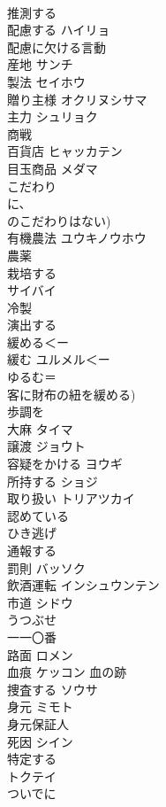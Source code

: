 \documentclass[8pt]{extreport}
\begin{document}
\begin{CJK}{UTF8}{min}
\\	推測する	
\\	配慮する	ハイリョ 
\\	配慮に欠ける言動 
\\	産地	サンチ 
\\	製法	セイホウ 
\\	贈り主様	オクリヌシサマ 
\\	主力	シュリョク 
\\	商戦	
\\	百貨店	ヒャッカテン 
\\	目玉商品	メダマ 
\\	こだわり	
\\	に、
\\	のこだわりはない)
\\	有機農法	ユウキノウホウ 
\\	農薬	
\\	栽培する	
\\	サイバイ
\\	冷製	
\\	演出する	
\\	緩める＜ー
\\	緩む	ユルメル＜ー
\\	ゆるむ＝
\\	客に財布の紐を緩める) 
\\	歩調を
\\	大麻	タイマ 
\\	譲渡	ジョウト　 
\\	容疑をかける	ヨウギ 
\\	所持する	ショジ 
\\	取り扱い	トリアツカイ 
\\	認めている	
\\	ひき逃げ	
\\	通報する	
\\	罰則	バッソク 
\\	飲酒運転	インシュウンテン 
\\	市道	シドウ 
\\	うつぶせ	
\\	一一〇番	
\\	路面	ロメン 
\\	血痕	ケッコン 血の跡 
\\	捜査する	ソウサ 
\\	身元	ミモト 
\\	身元保証人 
\\	死因	シイン 
\\	特定する	
\\	トクテイ
\\	ついでに	

\end{CJK}
\end{document}
